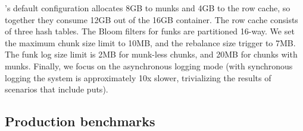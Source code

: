 \sys's default configuration 
allocates 8GB to munks and 4GB to the row cache,
so together they consume 12GB out of the 16GB container. 
The row cache consists of three hash tables.  
The Bloom filters for funks are partitioned 16-way.  
We set the \sys\/ maximum chunk size limit to 10MB, and the rebalance size trigger to 7MB. 
The funk log size limit is 2MB for munk-less chunks, and 20MB for chunks with munks. 
Finally, we focus on the asynchronous logging mode (with synchronous logging the system
is approximately 10x slower, trivializing the results of scenarios that include puts). 


\subsection{Production benchmarks}
\label{ssec:prod}

